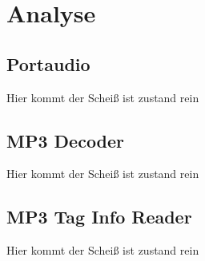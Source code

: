 
\chapter{Analyse}


\section{Portaudio}
Hier kommt der Scheiß ist zustand rein

\section{MP3 Decoder}
Hier kommt der Scheiß ist zustand rein

\section{MP3 Tag Info Reader}
Hier kommt der Scheiß ist zustand rein
